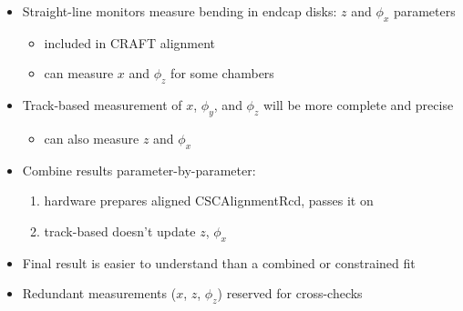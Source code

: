 \documentclass[compress]{beamer}
\begin{document}
\begin{frame}
\begin{columns}
\begin{itemize}
\item Straight-line monitors measure bending in endcap disks: $z$ and $\phi_x$ parameters
\begin{itemize}
\item included in CRAFT alignment
\item can measure $x$ and $\phi_z$ for some chambers
\end{itemize}
\item Track-based measurement of $x$, $\phi_y$, and $\phi_z$ will be more complete and precise
\begin{itemize}
\item can also measure $z$ and $\phi_x$
\end{itemize}
\item Combine results \mbox{parameter-by-parameter:\hspace{-1 cm}}
\begin{enumerate}
\item hardware prepares aligned CSCAlignmentRcd, passes it on
\item track-based doesn't update $z$, $\phi_x$
\end{enumerate}
\item Final result is easier to understand than a combined or constrained fit
\item Redundant measurements ($x$, $z$, $\phi_z$) reserved for cross-checks
\end{itemize}
\end{columns}
\end{frame}
\end{document}
